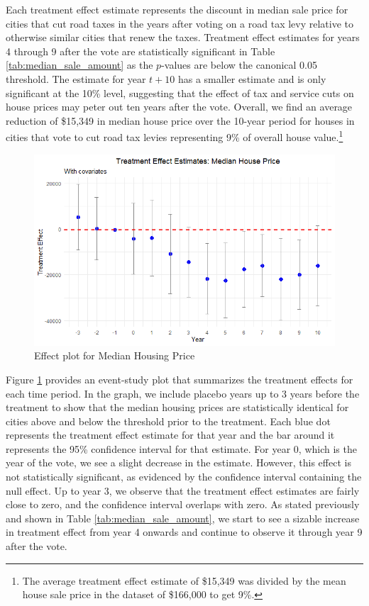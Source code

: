Each treatment effect estimate represents the discount in median sale price for cities that cut road taxes in the years after voting on a road tax levy relative to otherwise similar cities that renew the taxes. Treatment effect estimates for years 4 through 9 after the vote are statistically significant in Table \ref{tab:median_sale_amount} as the $p$-values are below the canonical 0.05 threshold. The estimate for year $t + 10$ has a smaller estimate and is only significant at the 10\% level, suggesting that the effect of tax and service cuts on house prices may peter out ten years after the vote. Overall, we find an average reduction of \$15,349 in median house price over the 10-year period for houses in cities that vote to cut road tax levies representing 9\% of overall house value.\footnote{The average treatment effect estimate of \$15,349 was divided by the mean house sale price in the dataset of \$166,000 to get 9\%.}

\begin{figure}[htbp]
    \centering
    \includegraphics[width=\textwidth,keepaspectratio]{images/tes_gs_reg.png}    
    \caption{Effect plot for Median Housing Price}
    \label{fig:tes_hp}
\end{figure}

Figure \ref{fig:tes_hp} provides an event-study plot that summarizes the treatment effects for each time period. In the graph, we include placebo years up to 3 years before the treatment to show that the median housing prices are statistically identical for cities above and below the threshold prior to the treatment. Each blue dot represents the treatment effect estimate for that year and the bar around it represents the 95\% confidence interval for that estimate. For year 0, which is the year of the vote, we see a slight decrease in the estimate. However, this effect is not statistically significant, as evidenced by the confidence interval containing the null effect. Up to year 3, we observe that the treatment effect estimates are fairly close to zero, and the confidence interval overlaps with zero. As stated previously and shown in Table \ref{tab:median_sale_amount}, we start to see a sizable increase in treatment effect from year 4 onwards and continue to observe it through year 9 after the vote. 
 

